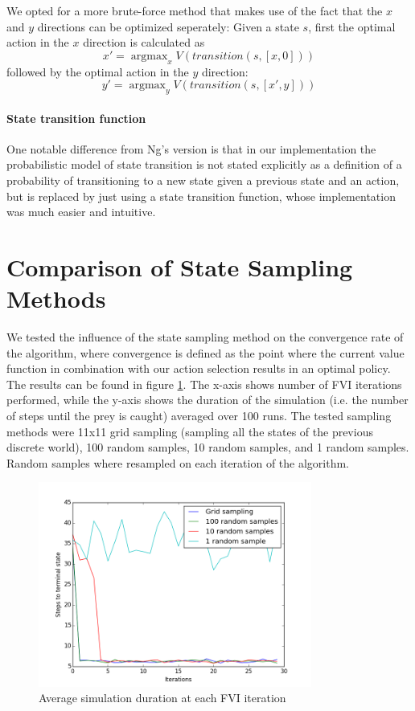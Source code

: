 \documentclass[a4paper, 12pt]{article}
\DeclareMathOperator*{\argmax}{argmax}
\begin{document}
We opted for a more brute-force method that makes use of the fact that
the $x$ and $y$ directions can be optimized seperately: Given a state $s$, first
the optimal action in the $x$ direction is calculated as
\[
  x' = \argmax_x V(transition(s, [x, 0]))
\]
followed by the optimal action in the $y$ direction:
\[
  y' = \argmax_y V(transition(s, [x', y]))
\]

\paragraph{State transition function}
One notable difference from Ng's version is that in our implementation
the probabilistic model of state transition is not stated explicitly
as a definition of a probability of transitioning to a new state 
given a previous state and an action, but is replaced by
just using a state transition function, whose implementation
was much easier and intuitive.

\section*{Comparison of State Sampling Methods}
\FloatBarrier
We tested the influence of the state sampling method on the convergence rate of
the algorithm, where convergence is defined as the point where the current value
function in combination with our action selection results in an optimal policy.
The results can be found in figure \ref{fig:conv}. The x-axis shows number of
FVI iterations performed, while the y-axis shows the duration of the simulation
(i.e. the number of steps until the prey is caught) averaged over 100 runs. The
tested sampling methods were 11x11 grid sampling (sampling all the states of the
previous discrete world), 100 random samples, 10 random samples, and 1 random
samples. Random samples where resampled on each iteration of the algorithm.

\begin{figure}[htb]
  \centering
  \includegraphics[width=0.8\textwidth]{convergence.png}
  \caption{Average simulation duration at each FVI iteration}
  \label{fig:conv}
\end{figure}
\end{document}
